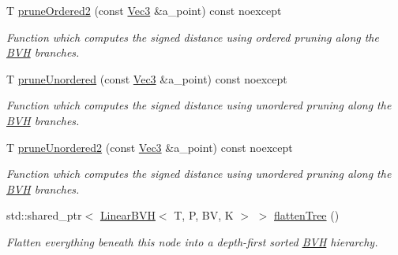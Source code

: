 \begin{DoxyCompactItemize}
T \hyperlink{classBVH_1_1NodeT_acb7fec40e06e97fcd42ec75169603e8b}{prune\+Ordered2} (const \hyperlink{classBVH_1_1NodeT_a6fbb4308c5c55ee170c5f992df7ae1d0}{Vec3} \&a\+\_\+point) const noexcept
\begin{DoxyCompactList}\small\item\em Function which computes the signed distance using ordered pruning along the \hyperlink{namespaceBVH}{B\+VH} branches. \end{DoxyCompactList}\item 
T \hyperlink{classBVH_1_1NodeT_a27cfc030a9b7f9b0341e94dc6733b511}{prune\+Unordered} (const \hyperlink{classBVH_1_1NodeT_a6fbb4308c5c55ee170c5f992df7ae1d0}{Vec3} \&a\+\_\+point) const noexcept
\begin{DoxyCompactList}\small\item\em Function which computes the signed distance using unordered pruning along the \hyperlink{namespaceBVH}{B\+VH} branches. \end{DoxyCompactList}\item 
T \hyperlink{classBVH_1_1NodeT_aafa2f1f4f4f58296531723e9a6d7d13a}{prune\+Unordered2} (const \hyperlink{classBVH_1_1NodeT_a6fbb4308c5c55ee170c5f992df7ae1d0}{Vec3} \&a\+\_\+point) const noexcept
\begin{DoxyCompactList}\small\item\em Function which computes the signed distance using unordered pruning along the \hyperlink{namespaceBVH}{B\+VH} branches. \end{DoxyCompactList}\item 
std\+::shared\+\_\+ptr$<$ \hyperlink{classBVH_1_1LinearBVH}{Linear\+B\+VH}$<$ T, P, BV, K $>$ $>$ \hyperlink{classBVH_1_1NodeT_a926e3990022ab28821d3f51e5fead023}{flatten\+Tree} ()
\begin{DoxyCompactList}\small\item\em Flatten everything beneath this node into a depth-\/first sorted \hyperlink{namespaceBVH}{B\+VH} hierarchy. \end{DoxyCompactList}\end{DoxyCompactItemize}
